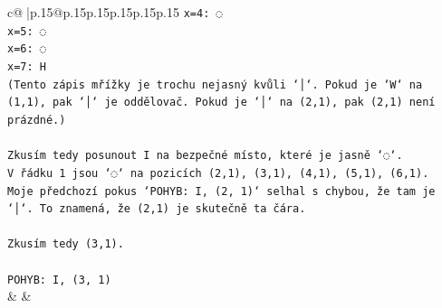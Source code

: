 \documentclass{article}
\begin{document}
{\begin{supertabular}{c@{$\;$}|p{.15\linewidth}@{}p{.15\linewidth}p{.15\linewidth}p{.15\linewidth}p{.15\linewidth}p{.15\linewidth}}
{{{\texttt{x=4: ◌} \\
\texttt{x=5: ◌} \\
\texttt{x=6: ◌} \\
\texttt{x=7: H} \\
\texttt{(Tento zápis mřížky je trochu nejasný kvůli `│`. Pokud je `W` na (1,1), pak `│` je oddělovač. Pokud je `│` na (2,1), pak (2,1) není prázdné.)} \\
\\ 
\texttt{Zkusím tedy posunout I na bezpečné místo, které je jasně `◌`.} \\
\texttt{V řádku 1 jsou `◌` na pozicích (2,1), (3,1), (4,1), (5,1), (6,1).} \\
\texttt{Moje předchozí pokus `POHYB: I, (2, 1)` selhal s chybou, že tam je `│`. To znamená, že (2,1) je skutečně ta čára.} \\
\\ 
\texttt{Zkusím tedy (3,1).} \\
\\ 
\texttt{POHYB: I, (3, 1)} \\
            }
        }
    }
    & & \\ \\


\end{supertabular}}
\end{document}
